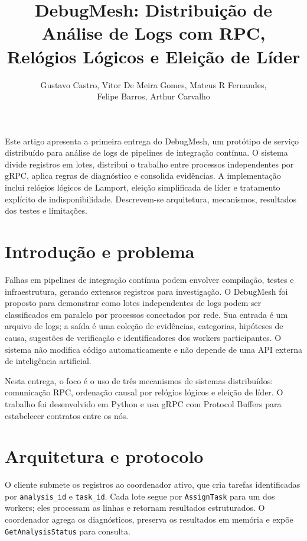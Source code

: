 \documentclass[12pt]{article}
\title{DebugMesh: Distribui\c{c}\~ao de An\'alise de Logs com RPC, Rel\'ogios L\'ogicos e Elei\c{c}\~ao de L\'ider}
\author{Gustavo Castro, Vitor De Meira Gomes, Mateus R Fernandes,\\{}Felipe Barros, Arthur Carvalho}
\begin{document}
\maketitle
\begin{resumo}
Este artigo apresenta a primeira entrega do DebugMesh, um prot\'otipo de servi\c{c}o distribu\'ido para an\'alise de logs de pipelines de integra\c{c}\~ao cont\'inua. O sistema divide registros em lotes, distribui o trabalho entre processos independentes por gRPC, aplica regras de diagn\'ostico e consolida evid\^encias. A implementa\c{c}\~ao inclui rel\'ogios l\'ogicos de Lamport, elei\c{c}\~ao simplificada de l\'ider e tratamento expl\'icito de indisponibilidade. Descrevem-se arquitetura, mecanismos, resultados dos testes e limita\c{c}\~oes.
\end{resumo}

\section{Introdu\c{c}\~ao e problema}
Falhas em pipelines de integra\c{c}\~ao cont\'inua podem envolver compila\c{c}\~ao, testes e infraestrutura, gerando extensos registros para investiga\c{c}\~ao. O DebugMesh foi proposto para demonstrar como lotes independentes de logs podem ser classificados em paralelo por processos conectados por rede. Sua entrada \'e um arquivo de logs; a sa\'ida \'e uma cole\c{c}\~ao de evid\^encias, categorias, hip\'oteses de causa, sugest\~oes de verifica\c{c}\~ao e identificadores dos workers participantes. O sistema n\~ao modifica c\'odigo automaticamente e n\~ao depende de uma API externa de intelig\^encia artificial.

Nesta entrega, o foco \'e o uso de tr\^es mecanismos de sistemas distribu\'idos: comunica\c{c}\~ao RPC, ordena\c{c}\~ao causal por rel\'ogios l\'ogicos e elei\c{c}\~ao de l\'ider. O trabalho foi desenvolvido em Python e usa gRPC com Protocol Buffers para estabelecer contratos entre os n\'os.

\section{Arquitetura e protocolo}
O cliente submete os registros ao coordenador ativo, que cria tarefas identificadas por \texttt{analysis\_id} e \texttt{task\_id}. Cada lote segue por \texttt{AssignTask} para um dos workers; eles processam as linhas e retornam resultados estruturados. O coordenador agrega os diagn\'osticos, preserva os resultados em mem\'oria e exp\~oe \texttt{GetAnalysisStatus} para consulta.
\end{document}
